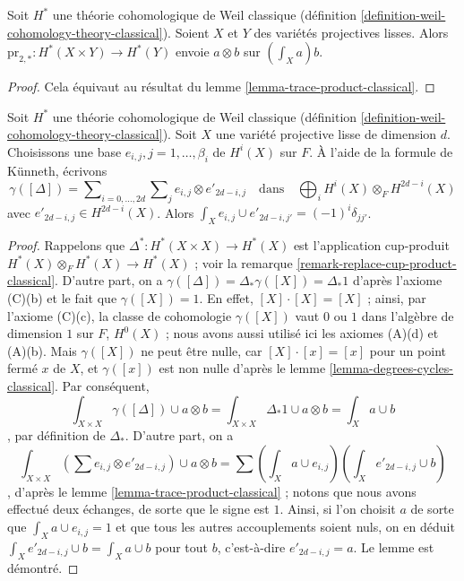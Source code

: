 \begin{lemma}
\label{lemma-pr2star-classical}
Soit $H^*$ une théorie cohomologique de Weil classique
(définition \ref{definition-weil-cohomology-theory-classical}).
Soient $X$ et $Y$ des variétés projectives lisses.
Alors $\text{pr}_{2, *} : H^*(X \times Y) \to H^*(Y)$
envoie $a \otimes b$ sur $(\int_X a) b$.
\end{lemma}

\begin{proof}
Cela équivaut au résultat du lemme \ref{lemma-trace-product-classical}.
\end{proof}

\begin{lemma}
\label{lemma-class-diagonal-classical}
Soit $H^*$ une théorie cohomologique de Weil classique
(définition \ref{definition-weil-cohomology-theory-classical}).
Soit $X$ une variété projective lisse de dimension $d$.
Choisissons une base $e_{i, j}, j = 1, \ldots, \beta_i$ de $H^i(X)$ sur $F$.
À l'aide de la formule de K\"unneth, écrivons
$$
\gamma([\Delta]) =
\sum\nolimits_{i = 0, \ldots, 2d}
\sum\nolimits_j e_{i, j} \otimes e'_{2d - i , j}
\quad\text{dans}\quad
\bigoplus\nolimits_i H^i(X) \otimes_F H^{2d - i}(X)
$$
avec $e'_{2d - i, j} \in H^{2d - i}(X)$.
Alors $\int_X e_{i, j} \cup e'_{2d - i, j'} = (-1)^i\delta_{jj'}$.
\end{lemma}

\begin{proof}
Rappelons que $\Delta^* : H^*(X \times X) \to H^*(X)$ est l'application
cup-produit $H^*(X) \otimes_F H^*(X) \to H^*(X)$ ; voir
la remarque \ref{remark-replace-cup-product-classical}. D'autre part, on a
$\gamma([\Delta]) = \Delta_*\gamma([X]) = \Delta_*1$ d'après
l'axiome (C)(b) et le fait que $\gamma([X]) = 1$. En effet,
$[X] \cdot [X] = [X]$ ; ainsi, par l'axiome (C)(c), la classe de cohomologie
$\gamma([X])$ vaut $0$ ou $1$ dans l'algèbre de dimension $1$ sur $F$, $H^0(X)$ ;
nous avons aussi utilisé ici les axiomes (A)(d) et (A)(b).
Mais $\gamma([X])$ ne peut être nulle, car $[X] \cdot [x] = [x]$
pour un point fermé $x$ de $X$, et $\gamma([x])$
est non nulle d'après le lemme \ref{lemma-degrees-cycles-classical}.
Par conséquent,
$$
\int_{X \times X} \gamma([\Delta]) \cup a \otimes b =
\int_{X \times X} \Delta_*1 \cup a \otimes b =
\int_X a \cup b
$$,
par définition de $\Delta_*$. D'autre part, on a
$$
\int_{X \times X} (\sum e_{i, j} \otimes e'_{2d -i , j}) \cup a \otimes b =
\sum (\int_X a \cup e_{i, j})(\int_X e'_{2d - i, j} \cup b)
$$,
d'après le lemme \ref{lemma-trace-product-classical} ; notons que nous avons
effectué deux échanges, de sorte que le signe est $1$.
Ainsi, si l'on choisit $a$ de sorte que $\int_X a \cup e_{i, j} = 1$
et que tous les autres accouplements soient nuls, on en déduit
$\int_X e'_{2d - i, j} \cup b = \int_X a \cup b$ pour tout $b$, c'est-à-dire
$e'_{2d - i, j} = a$. Le lemme est démontré.
\end{proof}

